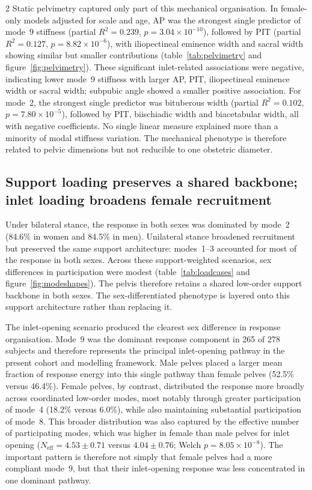 \documentclass[openacc]{rsproca_new}
\begin{document}
\begin{multicols}{2}
Static pelvimetry captured only part of this mechanical organisation. In female-only models adjusted for scale and age, AP was the strongest single predictor of mode~9 stiffness (partial $R^2=0.239$, $p=3.04 \times 10^{-10}$), followed by PIT (partial $R^2=0.127$, $p=8.82 \times 10^{-6}$), with iliopectineal eminence width and sacral width showing similar but smaller contributions (table~\ref{tab:pelvimetry} and figure~\ref{fig:pelvimetry}). These significant inlet-related associations were negative, indicating lower mode~9 stiffness with larger AP, PIT, iliopectineal eminence width or sacral width; subpubic angle showed a smaller positive association. For mode~2, the strongest single predictor was bituberous width (partial $R^2=0.102$, $p=7.80 \times 10^{-5}$), followed by PIT, biischiadic width and biacetabular width, all with negative coefficients. No single linear measure explained more than a minority of modal stiffness variation. The mechanical phenotype is therefore related to pelvic dimensions but not reducible to one obstetric diameter.

\subsection{Support loading preserves a shared backbone; inlet loading broadens female recruitment}

Under bilateral stance, the response in both sexes was dominated by mode~2 (84.6\% in women and 84.5\% in men). Unilateral stance broadened recruitment but preserved the same support architecture: modes~1--3 accounted for most of the response in both sexes. Across these support-weighted scenarios, sex differences in participation were modest (table~\ref{tab:loadcases} and figure~\ref{fig:modeshapes}). The pelvis therefore retains a shared low-order support backbone in both sexes. The sex-differentiated phenotype is layered onto this support architecture rather than replacing it.

The inlet-opening scenario produced the clearest sex difference in response organisation. Mode~9 was the dominant response component in 265 of 278 subjects and therefore represents the principal inlet-opening pathway in the present cohort and modelling framework. Male pelves placed a larger mean fraction of response energy into this single pathway than female pelves (52.5\% versus 46.4\%). Female pelves, by contrast, distributed the response more broadly across coordinated low-order modes, most notably through greater participation of mode~4 (18.2\% versus 6.0\%), while also maintaining substantial participation of mode~8. This broader distribution was also captured by the effective number of participating modes, which was higher in female than male pelves for inlet opening ($N_{\mathrm{eff}}=4.53\pm0.71$ versus $4.04\pm0.76$; Welch $p=8.05\times10^{-8}$). The important pattern is therefore not simply that female pelves had a more compliant mode~9, but that their inlet-opening response was less concentrated in one dominant pathway.


\end{multicols}
\end{document}
